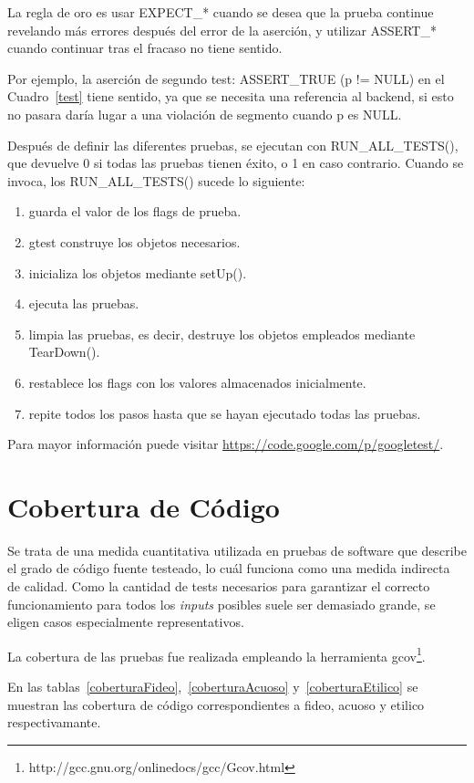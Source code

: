 \par La regla de oro es usar EXPECT\_* cuando se desea que la prueba continue revelando más errores después del error de la aserción, y utilizar ASSERT\_* cuando continuar tras el fracaso no tiene sentido.

\par Por ejemplo, la aserción de segundo test: ASSERT\_TRUE (p != NULL) en el Cuadro~\ref{test} tiene sentido, ya que se necesita una referencia al backend, si esto no pasara daría lugar a una violación de segmento cuando p es NULL.

\par Después de definir las diferentes pruebas, se ejecutan con RUN\_ALL\_TESTS(), que devuelve 0 si todas las pruebas tienen éxito, o 1 en caso contrario. Cuando se invoca, los RUN\_ALL\_TESTS() sucede lo siguiente:

\begin{enumerate}
	\item guarda el valor de los flags de prueba.
	\item gtest construye los objetos necesarios.
	\item inicializa los objetos mediante setUp().
	\item ejecuta las pruebas.
	\item limpia las pruebas, es decir, destruye los objetos empleados mediante TearDown().
	\item restablece los flags con los valores almacenados inicialmente.
	\item repite todos los pasos hasta que se hayan ejecutado todas las pruebas.
\end{enumerate}

Para mayor información puede visitar \url{https://code.google.com/p/googletest/}.

\section{Cobertura de Código}
\par Se trata de una medida cuantitativa utilizada en pruebas de software que describe el grado de código fuente testeado, lo cuál funciona como una medida indirecta de calidad. Como la cantidad de tests necesarios para garantizar el correcto funcionamiento para todos los \textit{inputs} posibles suele ser demasiado grande, se eligen casos especialmente representativos. 
\par La cobertura de las pruebas fue realizada empleando la herramienta gcov\footnote{http://gcc.gnu.org/onlinedocs/gcc/Gcov.html}. 
\par En las tablas~\ref{coberturaFideo},~\ref{coberturaAcuoso} y~\ref{coberturaEtilico} se muestran las cobertura de código correspondientes a fideo, acuoso y etilico respectivamante.

